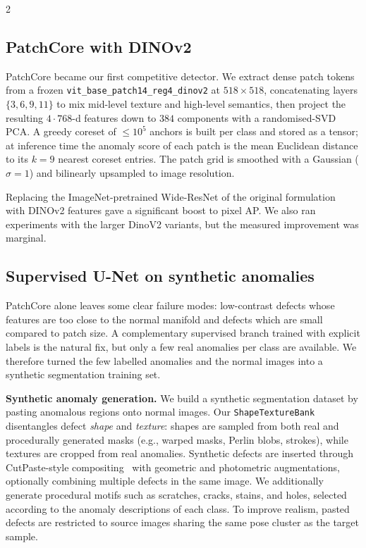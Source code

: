 \documentclass[11pt]{article}
\begin{document}
\begin{multicols}{2}
        \subsection{PatchCore with DINOv2}
        PatchCore became our first competitive detector. We extract dense
        patch tokens from a frozen \texttt{vit\_base\_patch14\_reg4\_dinov2}
        at $518 \times 518$, concatenating layers $\{3, 6, 9, 11\}$ to mix
        mid-level texture and high-level semantics, then project the resulting
        $4 \cdot 768$-d features down to $384$ components with a
        randomised-SVD PCA. A greedy coreset of $\leq 10^5$ anchors is built
        per class and stored as a tensor; at inference time the anomaly score
        of each patch is the mean Euclidean distance to its $k=9$ nearest
        coreset entries. The patch grid is smoothed with a Gaussian
        ($\sigma = 1$) and bilinearly upsampled to image resolution.

        Replacing the ImageNet-pretrained Wide-ResNet of the original
        formulation~\cite{roth2022patchcore} with DINOv2 features gave a significant boost to pixel AP.
        We also ran experiments with the larger DinoV2 variants, but the measured improvement was marginal.

        \subsection{Supervised U-Net on synthetic anomalies}
        PatchCore alone leaves some clear failure modes: low-contrast
        defects whose features are too close to the normal manifold and defects which are small compared to patch size. A
        complementary supervised branch trained with explicit labels is the natural fix, but only a few real
        anomalies per class are available. We therefore turned the few
        labelled anomalies and the normal images into a synthetic
        segmentation training set.

        \textbf{Synthetic anomaly generation.}
        We build a synthetic segmentation dataset by pasting anomalous regions onto normal images. Our \texttt{ShapeTextureBank} disentangles defect \emph{shape} and \emph{texture}: shapes are sampled from both real and procedurally generated masks (e.g., warped masks, Perlin blobs, strokes), while textures are cropped from real anomalies. Synthetic defects are inserted through CutPaste-style compositing~\cite{li2021cutpaste} with geometric and photometric augmentations, optionally combining multiple defects in the same image. We additionally generate procedural motifs such as scratches, cracks, stains, and holes, selected according to the anomaly descriptions of each class. To improve realism, pasted defects are restricted to source images sharing the same pose cluster as the target sample.
        

\end{multicols}
\end{document}

